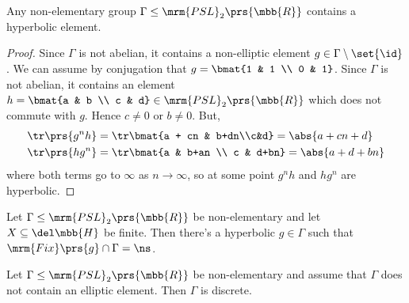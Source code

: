 \documentclass[10pt, twoside]{book}
\begin{document}
\begin{lemma}
Any non-elementary group $\Gamma \leq \mrm{PSL}_2\prs{\mbb{R}}$ contains a hyperbolic element.
\end{lemma}

\begin{proof}
Since $\Gamma$ is not abelian, it contains a non-elliptic element $g \in \Gamma \setminus \set{\id}$. We can assume by conjugation that $g = \bmat{1 & 1 \\ 0 & 1}$. Since $\Gamma$ is not abelian, it contains an element $h = \bmat{a & b \\ c & d} \in \mrm{PSL}_2\prs{\mbb{R}}$ which does not commute with $g$. Hence $c \neq 0$ or $b \neq 0$. But,
\begin{align*}
\tr\prs{g^n h} &= \tr\bmat{a + cn & b+dn\\c&d} = \abs{a + cn + d} \\
\tr\prs{h g^n} &= \tr\bmat{a & b+an \\ c & d+bn} = \abs{a + d + bn}
\end{align*}
where both terms go to $\infty$ as $n \to \infty$, so at some point $g^n h$ and $h g^n$ are hyperbolic.
\end{proof}

\begin{exercise}
Let $\Gamma \leq \mrm{PSL}_2\prs{\mbb{R}}$ be non-elementary and let $X \subseteq \del \mbb{H}$ be finite. Then there's a hyperbolic $g \in \Gamma$ such that $\mrm{Fix}\prs{g} \cap \Gamma = \ns$.
\end{exercise}

\begin{theorem}
Let $\Gamma \leq \mrm{PSL}_2\prs{\mbb{R}}$ be non-elementary and assume that $\Gamma$ does not contain an elliptic element. Then $\Gamma$ is discrete.
\end{theorem}
\end{document}
